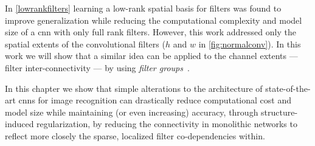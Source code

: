 \documentclass[thesis]{subfiles}
\begin{document}
	In \cref{lowrankfilters} learning a low-rank spatial basis for filters was found to improve generalization while reducing the computational complexity and model size of a \gls{cnn} with only full rank filters. However, this work addressed only the spatial extents of the convolutional filters (\ie $h$ and $w$ in \cref{fig:normalconv}). In this work we will show that a similar idea can be applied to the channel extents --- \ie filter inter-connectivity --- by using \emph{filter groups}~\citep{Krizhevsky2012}. 
	
	
	
	
	In this chapter we show that simple alterations to the architecture of state-of-the-art \glspl{cnn} for image recognition can drastically reduce computational cost and model size while maintaining (or even increasing) accuracy, through structure-induced regularization, by reducing the connectivity in monolithic networks to reflect more closely the sparse, localized filter co-dependencies within.
	
\end{document}
